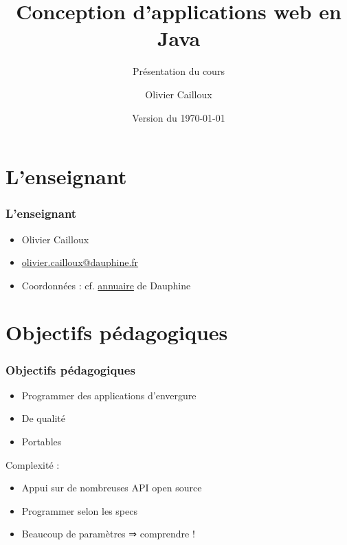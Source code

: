 \documentclass[english, french]{beamer}
\title{Conception d’applications web en Java}
\subtitle{Présentation du cours}
\author{Olivier Cailloux}
\institute[LAMSADE]{LAMSADE, Université Paris-Dauphine}
\date{Version du \today}
\begin{document}


\begin{frame}[plain]
   \titlepage
\end{frame}
\addtocounter{framenumber}{-1}

\section{L’enseignant}
\begin{frame}
	\frametitle{L’enseignant}
	\begin{itemize}
		\item Olivier Cailloux
		\item \href{mailto:olivier.cailloux@dauphine.fr}{olivier.cailloux@dauphine.fr}
		\item Coordonnées : cf. \href{https://www.ent.dauphine.fr/Annuaire/index.php?param0=fiche&param1=ocailloux}{annuaire} de Dauphine
	\end{itemize}
\end{frame}

\section[Obj. pédagogiques]{Objectifs pédagogiques}
\begin{frame}
	\frametitle{Objectifs pédagogiques}
	\begin{itemize}
		\item Programmer des applications d’envergure
		\item De qualité
		\item Portables
	\end{itemize}
	Complexité :
	\begin{itemize}
		\item Appui sur de nombreuses API open source
		\item Programmer selon les specs
		\item Beaucoup de paramètres ⇒ comprendre !
	\end{itemize}
\end{frame}
\end{document}
